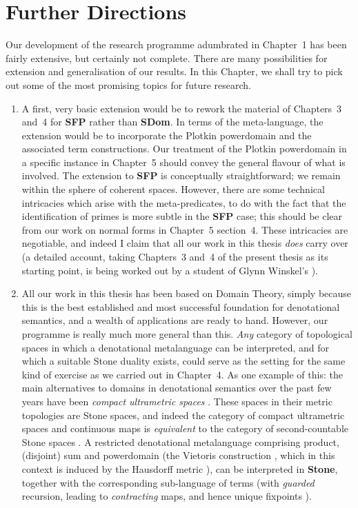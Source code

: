 \chapter{Further Directions}
Our development of the research programme adumbrated in Chapter~1 has been fairly extensive, but certainly not complete.
There are many possibilities for extension and generalisation of our results.
In this Chapter, we shall try to pick out some of the most promising topics for future research.
\begin{enumerate}
\item A first, very basic extension would be to rework the material of Chapters~3 and~4 for {\bf SFP} rather than {\bf SDom}.
In terms of the meta-language, the extension would be to incorporate the Plotkin powerdomain and the associated term constructions.
Our treatment of the Plotkin powerdomain in a specific instance in Chapter~5 should convey the general flavour of what is involved.
The extension to {\bf SFP} is conceptually straightforward; we remain within the sphere of coherent spaces.
However, there are some technical intricacies which arise with the meta-predicates, 
to do with the fact that the identification of primes is more subtle in the 
{\bf SFP} case; this should be clear from our work on normal forms in Chapter~5 section~4.
These intricacies are negotiable, and indeed I claim that all our work in this 
thesis {\em does} carry over (a detailed account, taking Chapters~3 and~4 of  
the present thesis as its starting point, is being worked out by a student of 
Glynn Winskel's \cite{Zha87}).
\item All our work in this thesis has been based on Domain Theory, simply because this is the best established and most successful foundation for denotational semantics, and a wealth of applications are ready to hand.
However, our programme is really much more general than this.
{\em Any} category of topological spaces in which a denotational metalanguage can be interpreted, and for which a suitable Stone duality exists, could serve as the setting for the same kind of exercise as we carried out in Chapter~4.
As one example of this: the main alternatives to domains in denotational 
semantics over the past few years have been {\em compact ultrametric spaces} 
\cite{Niv81,deBZ82,Mat85}.
These spaces in their metric topologies are Stone spaces, and indeed the category of compact ultrametric spaces and continuous maps is {\em equivalent} to the category of second-countable Stone spaces \cite{Abr85?}.
A restricted denotational metalanguage comprising product, (disjoint) sum and powerdomain (the Vietoris construction \cite{Joh85,Smy83}, which in this context is induced by the Hausdorff metric \cite{Niv81,deBZ82,Mat85}), can be interpreted in {\bf Stone}, together with the corresponding sub-language of terms (with {\em guarded} recursion, leading to {\em contracting} maps, and hence unique fixpoints \cite{Niv81,deBZ82,Mat85}).

\end{enumerate}
